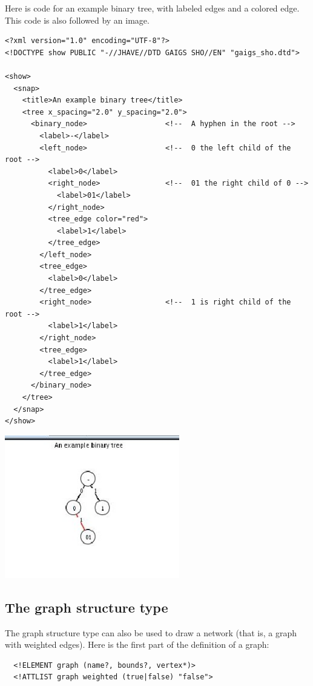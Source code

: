 \documentclass[11pt,letterpaper]{book}
\begin{document}
Here is code for an example binary tree, with labeled edges and a
colored edge. This code is also followed by an image.

\footnotesize \begin{verbatim}
<?xml version="1.0" encoding="UTF-8"?>
<!DOCTYPE show PUBLIC "-//JHAVE//DTD GAIGS SHO//EN" "gaigs_sho.dtd">

<show>
  <snap>
    <title>An example binary tree</title>
    <tree x_spacing="2.0" y_spacing="2.0">
      <binary_node>                  <!--  A hyphen in the root -->
        <label>-</label>  
        <left_node>                  <!--  0 the left child of the root -->
          <label>0</label>  
          <right_node>               <!--  01 the right child of 0 -->
            <label>01</label>
          </right_node>
          <tree_edge color="red">
            <label>1</label>
          </tree_edge>
        </left_node> 
        <tree_edge>
          <label>0</label>
        </tree_edge>
        <right_node>                 <!--  1 is right child of the root -->
          <label>1</label>
        </right_node>
        <tree_edge>
          <label>1</label>
        </tree_edge>
      </binary_node>
    </tree>
  </snap>
</show>
\end{verbatim} \normalsize

\begin{center}
  \includegraphics[width=3in]{howto_graphics/binarytree.eps}
\end{center}


\subsection{The graph structure type}

The graph structure type can also be used to draw a network (that is,
a graph with weighted edges). Here is the first part of the definition
of a graph:

\footnotesize \begin{verbatim}
  <!ELEMENT graph (name?, bounds?, vertex*)>
  <!ATTLIST graph weighted (true|false) "false">
\end{verbatim} \normalsize
\end{document}
